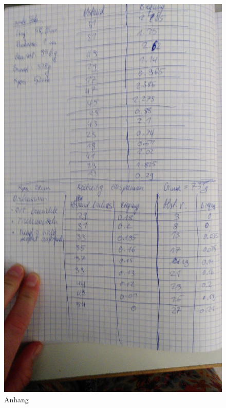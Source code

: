 \begin{figure}
    \centering
    \includegraphics[scale=0.8]{an2.jpeg}
    \caption{Anhang}
    \label{fig:fick}
\end{figure}
